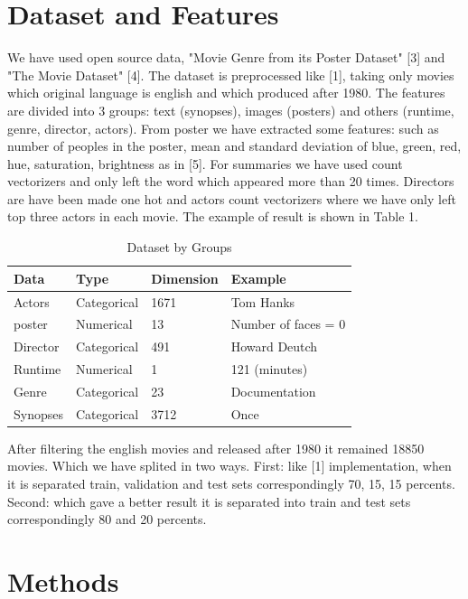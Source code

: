 \documentclass{article}
\begin{document}
\section{Dataset and Features}
\label{headings}

We have used open source data, "Movie Genre from its Poster Dataset" [3] and "The Movie Dataset" [4]. The dataset is preprocessed like [1], taking only movies which original language is english and which produced after 1980. The features are divided into 3 groups: text (synopses), images (posters) and others (runtime, genre, director, actors). From poster we have extracted some features: such as number of peoples in the poster, mean and standard deviation of blue, green, red, hue, saturation, brightness as in [5]. For summaries we have used count vectorizers and only left the word which appeared more than 20 times. Directors are have been made one hot and actors count vectorizers where we have only left top three actors in each movie. The example of result is shown in Table 1. 

\begin{table}
  \caption{Dataset by Groups}
  \label{dataset-table}
  \centering
  \begin{tabular}{llll}
    \toprule
    Data & Type & Dimension & Example  \\
    \midrule
    Actors & Categorical  & 1671 &  Tom Hanks   \\
    poster & Numerical & 13 & Number of faces = 0 \\
    Director & Categorical & 491 & Howard Deutch \\
    Runtime & Numerical & 1 & 121 (minutes) \\
    Genre & Categorical & 23 & Documentation \\
    Synopses & Categorical & 3712 & Once \\
    \bottomrule
  \end{tabular}
\end{table}
After filtering the english movies and released after 1980 it remained 18850 movies. Which we have splited in two ways. First: like [1] implementation, when it is separated train, validation and test sets correspondingly 70, 15, 15 percents. Second: which gave a better result it is separated into train and test sets correspondingly 80 and 20 percents. 

\section{Methods}
\label{methods}
\end{document}

